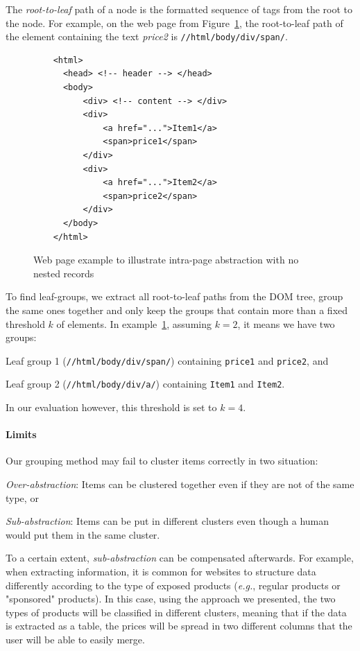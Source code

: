 \documentclass[sigconf,authordraft]{acmart}
\theoremstyle{definition}
\begin{document}
The \emph{root-to-leaf} path of a node is the formatted sequence of tags from the root to the node.
For example, on the web page from Figure~\ref{fig:non_recursive_html}, the root-to-leaf path of the element containing the text \emph{price2} is \lstinline{//html/body/div/span/}.

\begin{figure}[ht]
  \centering
  \begin{lstlisting}
    <html>
      <head> <!-- header --> </head>
      <body>
          <div> <!-- content --> </div>
          <div>
              <a href="...">Item1</a>
              <span>price1</span>
          </div>
          <div>
              <a href="...">Item2</a>
              <span>price2</span>
          </div>
      </body>
    </html>
  \end{lstlisting}
  \caption{Web page example to illustrate intra-page abstraction with no nested records}
  \label{fig:non_recursive_html}
\end{figure}

To find leaf-groups, we extract all root-to-leaf paths from the DOM tree, group the same ones together
and only keep the groups that contain more than a fixed threshold $k$ of elements.
In example~\ref{fig:non_recursive_html}, assuming $k=2$, it means we have two groups:
\begin{compactenum}
  \item Leaf group 1 (\texttt{//html/body/div/span/}) containing \texttt{price1} and \texttt{price2}, and
  \item Leaf group 2 (\texttt{//html/body/div/a/}) containing \texttt{Item1} and \texttt{Item2}.
\end{compactenum}
In our evaluation however, this threshold is set to $k=4$.

\paragraph{Limits}
Our grouping method may fail to cluster items correctly in two situation:
\begin{compactitem}
  \item \emph{Over-abstraction}: Items can be clustered together even if they are not of the same type, or
  \item \emph{Sub-abstraction}: Items can be put in different clusters even though a human would put them in the same cluster.
\end{compactitem}
To a certain extent, \emph{sub-abstraction} can be compensated afterwards.
For example, when extracting information, it is common for websites to structure data differently according to the type of exposed products (\emph{e.g.}, regular products or "sponsored" products). 
In this case, using the approach we presented, the two types of products will be classified in different clusters, meaning that if the data is extracted as a table, the prices will be spread in two different columns that the user will be able to easily merge.
\end{document}
